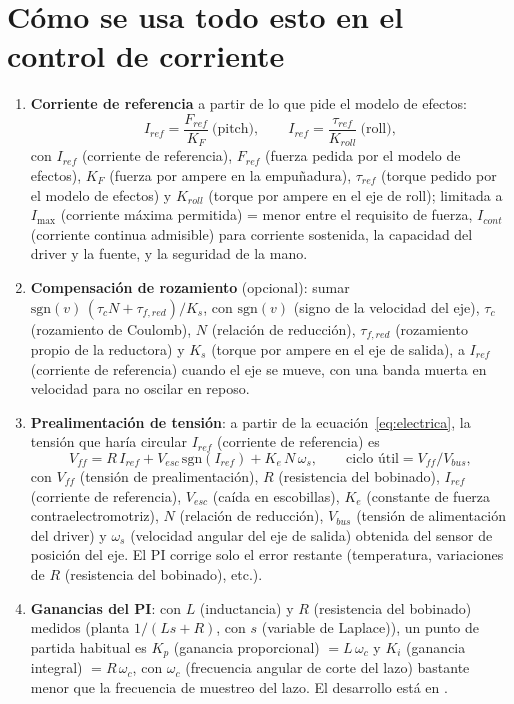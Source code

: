 \documentclass[11pt,a4paper]{article}
\newcommand{\code}[1]{\texttt{\detokenize{#1}}}
\begin{document}
\section{Cómo se usa todo esto en el control de corriente}
\label{sec:control}

\begin{enumerate}
\item \textbf{Corriente de referencia} a partir de lo que pide el modelo de efectos:
\[
I_{ref} = \frac{F_{ref}}{K_F}\ \text{(pitch)}, \qquad I_{ref} = \frac{\tau_{ref}}{K_{roll}}\ \text{(roll)},
\]
con $I_{ref}$ (corriente de referencia), $F_{ref}$ (fuerza pedida por el modelo de efectos), $K_F$ (fuerza por ampere en la empuñadura), $\tau_{ref}$ (torque pedido por el modelo de efectos) y $K_{roll}$ (torque por ampere en el eje de roll); limitada a $I_{\max}$ (corriente máxima permitida) = menor entre el requisito de fuerza, $I_{cont}$ (corriente continua admisible) para corriente sostenida, la capacidad del driver y la fuente, y la seguridad de la mano.
\item \textbf{Compensación de rozamiento} (opcional): sumar $\mathrm{sgn}(v)\,(\tau_c N + \tau_{f,red})/K_{s}$, con $\mathrm{sgn}(v)$ (signo de la velocidad del eje), $\tau_c$ (rozamiento de Coulomb), $N$ (relación de reducción), $\tau_{f,red}$ (rozamiento propio de la reductora) y $K_s$ (torque por ampere en el eje de salida), a $I_{ref}$ (corriente de referencia) cuando el eje se mueve, con una banda muerta en velocidad para no oscilar en reposo.
\item \textbf{Prealimentación de tensión}: a partir de la ecuación~\eqref{eq:electrica}, la tensión que haría circular $I_{ref}$ (corriente de referencia) es
\[
V_{ff} = R\,I_{ref} + V_{esc}\,\mathrm{sgn}(I_{ref}) + K_e\,N\,\omega_s,
\qquad \text{ciclo útil} = V_{ff}/V_{bus},
\]
con $V_{ff}$ (tensión de prealimentación), $R$ (resistencia del bobinado), $I_{ref}$ (corriente de referencia), $V_{esc}$ (caída en escobillas), $K_e$ (constante de fuerza contraelectromotriz), $N$ (relación de reducción), $V_{bus}$ (tensión de alimentación del driver) y $\omega_s$ (velocidad angular del eje de salida) obtenida del sensor de posición del eje. El PI corrige solo el error restante (temperatura, variaciones de $R$ (resistencia del bobinado), etc.).
\item \textbf{Ganancias del PI}: con $L$ (inductancia) y $R$ (resistencia del bobinado) medidos (planta $1/(Ls + R)$, con $s$ (variable de Laplace)), un punto de partida habitual es $K_p$ (ganancia proporcional) $= L\,\omega_c$ y $K_i$ (ganancia integral) $= R\,\omega_c$, con $\omega_c$ (frecuencia angular de corte del lazo) bastante menor que la frecuencia de muestreo del lazo. El desarrollo está en \code{procedimiento_control_corriente.tex}.
\end{enumerate}
\end{document}

